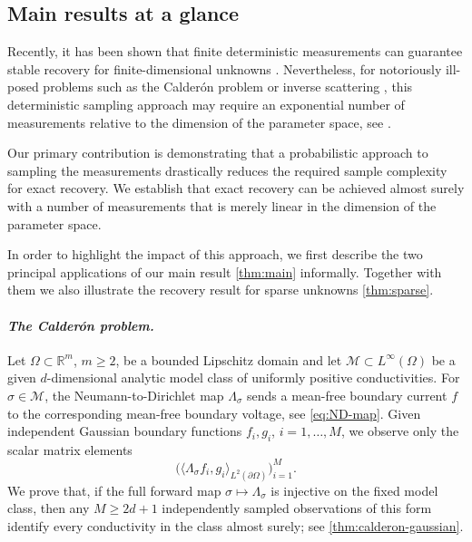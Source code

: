 \documentclass[11pt,oneside]{amsart}
\theoremstyle{plain}
\theoremstyle{definition}
\theoremstyle{remark}
\newcommand{\RR}{\mathbb{R}}
\begin{document}
\subsection{Main results at a glance}\label{sec:main-results-glance}
Recently, it has been shown that finite deterministic measurements can guarantee stable recovery for finite-dimensional unknowns \cite{alberti2022infinite}. Nevertheless, for notoriously ill-posed problems such as the Calder\'on problem \cite{alessandrini1988stable,mandache2001exponential} or inverse scattering \cite{stefanov1990stability}, this deterministic sampling approach may require an exponential number of measurements relative to the dimension of the parameter space, see \cite[Example 4]{alberti2022infinite}.

Our primary contribution is demonstrating that a probabilistic approach to sampling the measurements drastically reduces the required sample complexity for exact recovery. We establish that exact recovery can be achieved almost surely with a number of measurements that is merely linear in the dimension of the parameter space.

In order to highlight the impact of this approach, we first describe the two principal applications of our main result \cref{thm:main} informally. Together with them we also illustrate the recovery result for sparse unknowns \cref{thm:sparse}.
\vspace{.1cm}
\paragraph{\emph{The Calder\'on problem.}}
Let $\Omega\subset\RR^m$, $m\geq 2$, be a bounded Lipschitz domain and let $\mathcal M\subset L^\infty(\Omega)$ be a given $d$-dimensional analytic model class of uniformly positive conductivities. For  $\sigma\in\mathcal M$, the Neumann-to-Dirichlet map $\Lambda_\sigma$ sends a mean-free boundary current $f$ to the corresponding mean-free boundary voltage, see \eqref{eq:ND-map}. Given independent Gaussian boundary functions $f_i,g_i$, $i=1,\dots,M$, we observe only the scalar matrix elements
\begin{equation}\label{eq:intro-calderon-measurements}
    \bigl(\langle \Lambda_\sigma f_i,g_i\rangle_{L^2(\partial\Omega)}\bigr)_{i=1}^M.
\end{equation}
We prove that, if the full forward map $\sigma\mapsto\Lambda_\sigma$ is injective on the fixed model class, then any $M\geq 2d+1$ independently sampled observations of this form identify every conductivity in the class almost surely; see \cref{thm:calderon-gaussian}.
\end{document}
